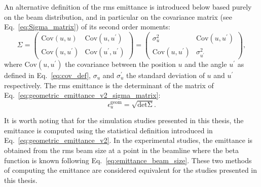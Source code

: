 An alternative definition of the rms emittance is introduced below based purely on the beam distribution, and in particular on the covariance matrix (see Eq.~\eqref{eq:Sigma_matrix}) of its second order moments:
\begin{equation}\label{eq:geometric_emittance_v2_sigma_matrix}
    \Sigma = \begin{pmatrix}
        \mathrm{Cov}(u,u) & \mathrm{Cov}(u,u^\prime)  \\ 
         \mathrm{Cov}(u,u^\prime) & \mathrm{Cov}(u^\prime,u^\prime)
        \end{pmatrix} = \begin{pmatrix}
            \sigma^2_u & \mathrm{Cov}(u,u^\prime)  \\ 
             \mathrm{Cov}(u,u^\prime) & \sigma^2_{u^\prime}
            \end{pmatrix},
\end{equation}
where $ \mathrm{Cov}(u,u^\prime)$ the covariance between the position $u$ and the angle $u^\prime$ as defined in Eq.~\eqref{eq:cov_def}, $\sigma_u$ and $\sigma_u^\prime$ the standard deviation of $u$ and $u^\prime$ respectively. The rms emittance is the determinant of the matrix of Eq.~\eqref{eq:geometric_emittance_v2_sigma_matrix}:
\begin{equation}\label{eq:geometric_emittance_v2}
    \epsilon^{\mathrm{geom}}_u = \sqrt{\mathrm{det \Sigma}}.
\end{equation}


It is worth noting that for the simulation studies presented in this thesis, the emittance is computed using the statistical definition introduced in Eq.~\eqref{eq:geometric_emittance_v2}. In the experimental studies, the emittance is obtained from the rms beam size at a point in the beamline where the beta function is known following Eq.~\eqref{eq:emittance_beam_size}. These two methods of computing the emittance are considered equivalent for the studies presented in this thesis.
 

 
 
